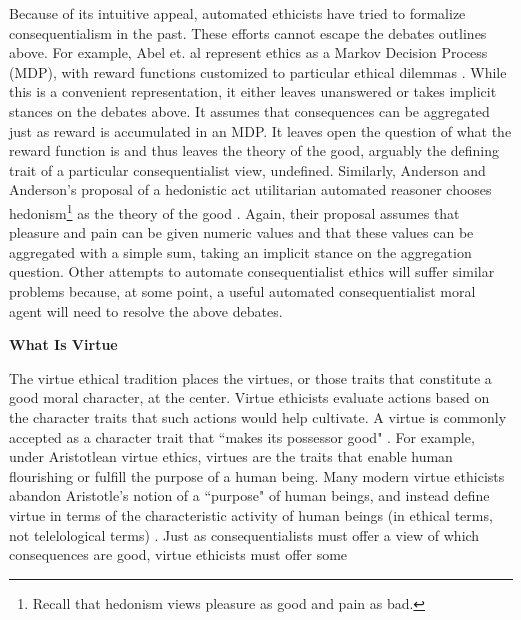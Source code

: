 \begin{isabellebody}
\begin{isamarkuptext}
Because of its intuitive appeal, automated ethicists have tried to formalize consequentialism in the past.
These efforts cannot escape the debates outlines above. For example, Abel et. al represent ethics as a
Markov Decision Process (MDP), with reward functions customized to particular ethical dilemmas 
\cite[3]{util1}. While this is a convenient representation, it either leaves unanswered or 
takes implicit stances on the debates above. It assumes that consequences can be aggregated just as 
reward is accumulated in an MDP. It leaves open the question of what the reward function is and thus 
leaves the theory of the good, arguably the defining trait of a particular consequentialist view, 
undefined. Similarly, Anderson and Anderson's proposal of a hedonistic act 
utilitarian automated reasoner chooses hedonism\footnote{Recall that hedonism views pleasure as good
and pain as bad.} as the theory of the good \cite[2]{util2}. Again, their proposal assumes that pleasure and pain can be 
given numeric values and that these values can be aggregated with a simple sum, taking an implicit
stance on the aggregation question. Other attempts to automate consequentialist ethics will suffer 
similar problems because, at some point, a useful automated consequentialist moral agent will need 
to resolve the above debates.%
\end{isamarkuptext}\isamarkuptrue%
%
\isadelimdocument
%
\endisadelimdocument
%
\isatagdocument
%
\isamarkuptrue%
%
\endisatagdocument
{\isafolddocument}%
%
\isadelimdocument
%
\endisadelimdocument
%
\begin{isamarkuptext}%
\textbf{What Is Virtue}%
\end{isamarkuptext}\isamarkuptrue%
%
\begin{isamarkuptext}%
The virtue ethical tradition places the virtues, or those traits that constitute a 
good moral character, at the center. Virtue ethicists evaluate actions based on the character traits 
that such actions would help cultivate. A virtue is commonly accepted as a character trait that 
``makes its possessor good" \cite{vesep}. For example, under Aristotlean virtue ethics, virtues 
are the traits that enable human flourishing or fulfill the purpose of a human being. Many modern 
virtue ethicists abandon Aristotle's notion of a ``purpose" of human beings, and instead define virtue 
in terms of the characteristic activity of human beings (in ethical terms, not telelological terms) \cite{snow}. 
Just as consequentialists must offer a view of which consequences are good, virtue ethicists must offer some 

\end{isamarkuptext}
\end{isabellebody}
